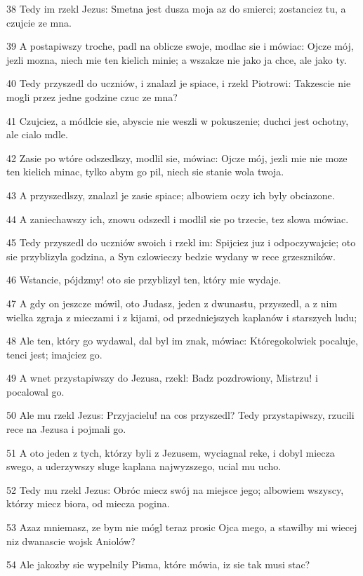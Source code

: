 \par 38 Tedy im rzekl Jezus: Smetna jest dusza moja az do smierci; zostanciez tu, a czujcie ze mna.
\par 39 A postapiwszy troche, padl na oblicze swoje, modlac sie i mówiac: Ojcze mój, jezli mozna, niech mie ten kielich minie; a wszakze nie jako ja chce, ale jako ty.
\par 40 Tedy przyszedl do uczniów, i znalazl je spiace, i rzekl Piotrowi: Takzescie nie mogli przez jedne godzine czuc ze mna?
\par 41 Czujciez, a módlcie sie, abyscie nie weszli w pokuszenie; duchci jest ochotny, ale cialo mdle.
\par 42 Zasie po wtóre odszedlszy, modlil sie, mówiac: Ojcze mój, jezli mie nie moze ten kielich minac, tylko abym go pil, niech sie stanie wola twoja.
\par 43 A przyszedlszy, znalazl je zasie spiace; albowiem oczy ich byly obciazone.
\par 44 A zaniechawszy ich, znowu odszedl i modlil sie po trzecie, tez slowa mówiac.
\par 45 Tedy przyszedl do uczniów swoich i rzekl im: Spijciez juz i odpoczywajcie; oto sie przyblizyla godzina, a Syn czlowieczy bedzie wydany w rece grzeszników.
\par 46 Wstancie, pójdzmy! oto sie przyblizyl ten, który mie wydaje.
\par 47 A gdy on jeszcze mówil, oto Judasz, jeden z dwunastu, przyszedl, a z nim wielka zgraja z mieczami i z kijami, od przedniejszych kaplanów i starszych ludu;
\par 48 Ale ten, który go wydawal, dal byl im znak, mówiac: Któregokolwiek pocaluje, tenci jest; imajciez go.
\par 49 A wnet przystapiwszy do Jezusa, rzekl: Badz pozdrowiony, Mistrzu! i pocalowal go.
\par 50 Ale mu rzekl Jezus: Przyjacielu! na cos przyszedl? Tedy przystapiwszy, rzucili rece na Jezusa i pojmali go.
\par 51 A oto jeden z tych, którzy byli z Jezusem, wyciagnal reke, i dobyl miecza swego, a uderzywszy sluge kaplana najwyzszego, ucial mu ucho.
\par 52 Tedy mu rzekl Jezus: Obróc miecz swój na miejsce jego; albowiem wszyscy, którzy miecz biora, od miecza pogina.
\par 53 Azaz mniemasz, ze bym nie mógl teraz prosic Ojca mego, a stawilby mi wiecej niz dwanascie wojsk Aniolów?
\par 54 Ale jakozby sie wypelnily Pisma, które mówia, iz sie tak musi stac?
